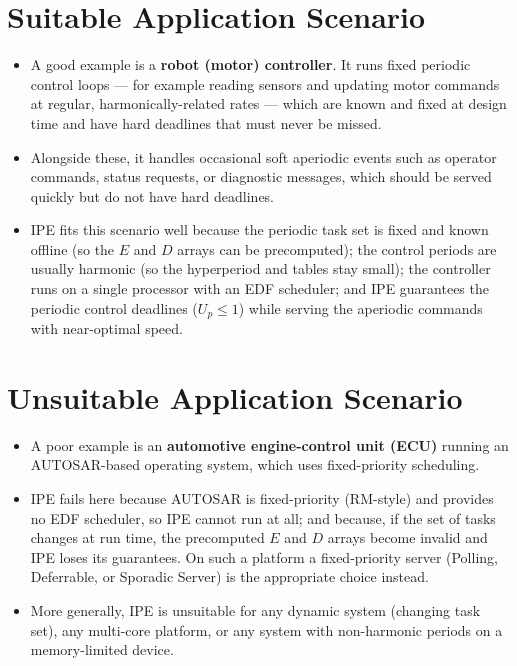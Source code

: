 \documentclass[conference]{IEEEtran}
\begin{document}
\section{Suitable Application Scenario}

\begin{itemize}
  \item A good example is a \textbf{robot (motor) controller}. It runs fixed
        periodic control loops --- for example reading sensors and updating
        motor commands at regular, harmonically-related rates --- which are
        known and fixed at design time and have hard deadlines that must never
        be missed.
  \item Alongside these, it handles occasional soft aperiodic events such as
        operator commands, status requests, or diagnostic messages, which
        should be served quickly but do not have hard deadlines.
  \item IPE fits this scenario well because the periodic task set is fixed and
        known offline (so the $E$ and $D$ arrays can be precomputed); the
        control periods are usually harmonic (so the hyperperiod and tables stay
        small); the controller runs on a single processor with an EDF
        scheduler; and IPE guarantees the periodic control deadlines
        ($U_p \leq 1$) while serving the aperiodic commands with near-optimal
        speed.
\end{itemize}

\section{Unsuitable Application Scenario}

\begin{itemize}
  \item A poor example is an \textbf{automotive engine-control unit (ECU)}
        running an AUTOSAR-based operating system, which uses fixed-priority
        scheduling.
  \item IPE fails here because AUTOSAR is fixed-priority (RM-style) and provides
        no EDF scheduler, so IPE cannot run at all; and because, if the set of
        tasks changes at run time, the precomputed $E$ and $D$ arrays become
        invalid and IPE loses its guarantees. On such a platform a
        fixed-priority server (Polling, Deferrable, or Sporadic Server) is the
        appropriate choice instead.
  \item More generally, IPE is unsuitable for any dynamic system (changing task
        set), any multi-core platform, or any system with non-harmonic periods
        on a memory-limited device.
\end{itemize}
\end{document}

